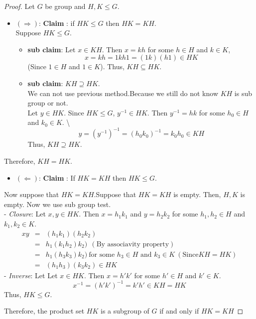 \documentclass[
]{book}
\providecommand{\tightlist}{%
  \setlength{\itemsep}{0pt}\setlength{\parskip}{0pt}}
\theoremstyle{definition}
\theoremstyle{definition}
\theoremstyle{definition}
\theoremstyle{definition}
\theoremstyle{remark}
\begin{document}
\begin{proof}
Let \(G\) be group and \(H,K\leq G\).

\begin{itemize}
\item
  \((\Longrightarrow)\): \textbf{Claim }: if \(HK\leq G\) then \(HK=KH\).\\

  Suppose \(HK\leq G\).

  \begin{itemize}
  \tightlist
  \item
    \textbf{sub claim}:
    Let \(x\in KH\). Then \(x=kh\) for some \(h\in H\) and \(k\in K\),
    \[x=kh=1kh1=(1k)(h1)\in HK\]
    (Since \(1\in H\) and \(1\in K\)). Thus, \(KH \subseteq HK\).\\
  \item
    \textbf{sub claim}: \(KH \supseteq HK\).\\
    We can not use previous method.Because we still do not know \(KH\) is sub group or not.\\
    Let \(y\in HK\). Since \(HK\leq G\), \(y^{-1}\in HK\). Then \(y^{-1}=hk\) for some \(h_0\in H\) and \(k_0\in K\). \textbackslash{}
    \[y=(y^{-1})^{-1}=(h_0k_0)^{-1}=k_0h_0\in KH\]
    Thus, \(KH \supseteq HK\).
  \end{itemize}
\end{itemize}

Therefore, \(KH=HK\).

\begin{itemize}
\tightlist
\item
  \((\Longleftarrow)\): \textbf{Claim }: If \(HK=KH\) then \(HK\leq G\).\\
\end{itemize}

Now suppose that \(HK=KH\).Suppose that \(HK=KH\) is empty. Then, \(H,K\) is empty. Now we use sub group test.\\
- \emph{Closure}: Let \(x,y\in HK\). Then \(x=h_1k_1\) and \(y=h_2k_2\) for some \(h_1,h_2\in H\) and \(k_1,k_2\in K\).
\begin{eqnarray}
  xy&=&(h_1k_1)(h_2k_2)\\
  &=& h_1(k_1h_2)k_2) ~~(\text{By associavity property})\\
  &=& h_1(h_3k_3)k_2) ~\text{for some  }h_3\in H \text{ and } k_3\in K ~(\text{Since} KH=HK)\\
  &=& (h_1h_3)(k_3k_2)\in HK
\end{eqnarray}
- \emph{Inverse}: Let Let \(x\in HK\). Then \(x=h'k'\) for some \(h'\in H\) and \(k'\in K\).
\[x^{-1}=(h'k')^{-1}=k'h'\in KH=HK\]
Thus, \(HK\leq G\).

Therefore, the product set \(HK\) is a subgroup of \(G\) if and only if \(HK = KH\)
\end{proof}
\end{document}
